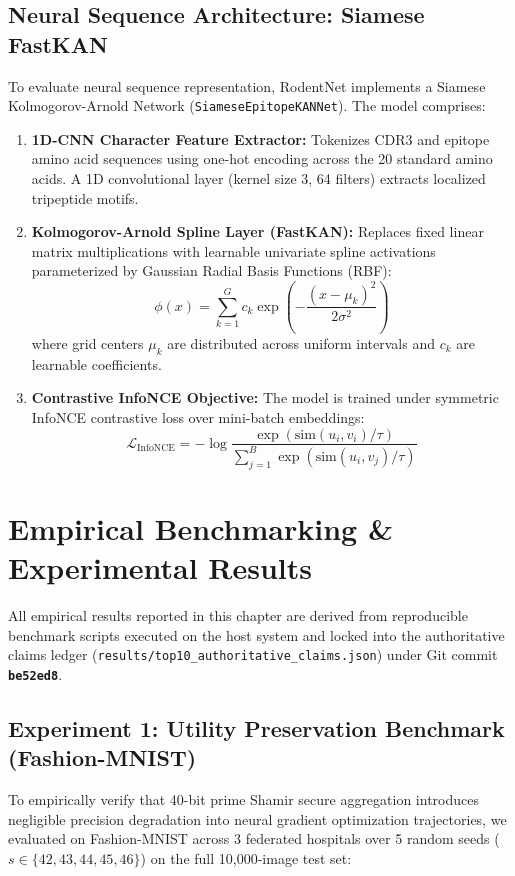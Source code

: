 \documentclass[11pt,a4paper]{report}
\begin{document}
\section{Neural Sequence Architecture: Siamese FastKAN}
To evaluate neural sequence representation, RodentNet implements a Siamese Kolmogorov-Arnold Network (\lstinline|SiameseEpitopeKANNet|). The model comprises:
\begin{enumerate}[itemsep=2pt]
  \item \textbf{1D-CNN Character Feature Extractor:} Tokenizes CDR3 and epitope amino acid sequences using one-hot encoding across the 20 standard amino acids. A 1D convolutional layer (kernel size 3, 64 filters) extracts localized tripeptide motifs.
  \item \textbf{Kolmogorov-Arnold Spline Layer (FastKAN):} Replaces fixed linear matrix multiplications with learnable univariate spline activations parameterized by Gaussian Radial Basis Functions (RBF):
  \begin{equation}
  \phi(x) = \sum_{k=1}^G c_k \exp\left(-\frac{(x - \mu_k)^2}{2\sigma^2}\right)
  \end{equation}
  where grid centers $\mu_k$ are distributed across uniform intervals and $c_k$ are learnable coefficients.
  \item \textbf{Contrastive InfoNCE Objective:} The model is trained under symmetric InfoNCE contrastive loss over mini-batch embeddings:
  \begin{equation}
  \mathcal{L}_{\text{InfoNCE}} = -\log \frac{\exp(\text{sim}(u_i, v_i)/\tau)}{\sum_{j=1}^B \exp(\text{sim}(u_i, v_j)/\tau)}
  \end{equation}
\end{enumerate}

\chapter{Empirical Benchmarking \& Experimental Results}
\label{chap:results}

All empirical results reported in this chapter are derived from reproducible benchmark scripts executed on the host system and locked into the authoritative claims ledger (\lstinline|results/top10_authoritative_claims.json|) under Git commit \textbf{\texttt{be52ed8}}.

\section{Experiment 1: Utility Preservation Benchmark (Fashion-MNIST)}
To empirically verify that 40-bit prime Shamir secure aggregation introduces negligible precision degradation into neural gradient optimization trajectories, we evaluated on Fashion-MNIST across 3 federated hospitals over 5 random seeds ($s \in \{42, 43, 44, 45, 46\}$) on the full 10{,}000-image test set:
\end{document}
